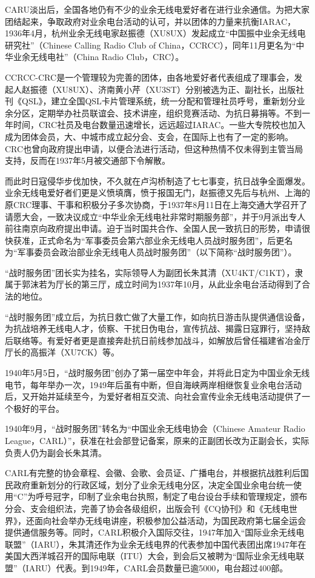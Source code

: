 \documentclass[12pt,UTF8]{ctexbook}
\begin{document}
CARU淡出后，全国各地仍有不少的业余无线电爱好者在进行业余通信。为把大家团结起来，争取政府对业余电台活动的认可，并以团体的力量来抗衡IARAC，1936年4月，杭州业余无线电家赵振德（XU8UX）发起成立“中国振中业余无线电研究社”（Chinese Calling Radio Club of China，CCRCC），同年11月更名为“中华业余无线电社”（China Radio Club，CRC）。

CCRCC-CRC是一个管理较为完善的团体，由各地爱好者代表组成了理事会，发起人赵振德（XU8UX）、济南黄小芹（XU3ST）分别被选为正、副社长，出版社刊《QSL》，建立全国QSL卡片管理系统，统一分配和管理社员呼号，重新划分业余分区，定期举办社员联谊会、技术讲座，组织竞赛活动、为抗日募捐等。不到一年时间，CRC社员及电台数量迅速增长，远远超过IARAC。一些大专院校也加入成为团体会员，大、中城市成立起分会、支会，在国际上也有了一定的影响。CRC也曾向政府提出申请，以便合法进行活动，但这种热情不仅未得到主管当局支持，反而在1937年5月被交通部下令解散。

而此时日寇侵华步伐加快，不久就在卢沟桥制造了七七事变，抗日战争全面爆发。业余无线电爱好者们更是义愤填膺，愤于报国无门，赵振德又先后与杭州、上海的原CRC理事、干事和积极分子多次协商，于1937年8月11日在上海交通大学召开了请愿大会，一致决议成立“中华业余无线电社非常时期服务部”，并于9月派出专人前往南京向政府提出申请。迫于当时国共合作、全国人民一致抗日的形势，申请很快获准，正式命名为“军事委员会第六部业余无线电人员战时服务团”，后更名为“军事委员会政治部业余无线电人员战时服务团”（以下简称“战时服务团”）。

“战时服务团”团长实为挂名，实际领导人为副团长朱其清（XU4KT/C1KT），隶属于郭沫若为厅长的第三厅，成立时间为1937年10月，从此业余电台活动得到了合法的地位。

“战时服务团”成立后，为抗日救亡做了大量工作，如向抗日游击队提供通信设备，为抗战培养无线电人才，侦察、干扰日伪电台，宣传抗战、揭露日寇罪行，坚持敌后联络等。有爱好者更是直接奔赴抗日前线参加战斗，如解放后曾任福建省冶金厅厅长的高振洋（XU7CK）等。

1940年5月5日，“战时服务团”创办了第一届空中年会，并将此日定为中国业余无线电节，每年举办一次，1949年后虽有中断，但自海峡两岸相继恢复业余电台活动后，又开始并延续至今，为爱好者相互交流、向社会宣传业余无线电活动提供了一个极好的平台。

1940年9月，“战时服务团”转名为“中国业余无线电协会（Chinese Amateur Radio League，CARL）”，获准在社会部登记备案，原来的正副团长改为正副会长，实际负责人仍为副会长朱其清。

CARL有完整的协会章程、会徽、会歌、会员证、广播电台，并根据抗战胜利后国民政府重新划分的行政区域，划分了业余无线电分区，决定全国业余电台统一使用“C”为呼号冠字，印制了业余电台执照，制定了电台设台手续和管理规定，颁布分会、支会组织法，完善了协会各级组织，出版会刊《CQ协刊》和《无线电世界》，还面向社会举办无线电讲座，积极参加公益活动，为国民政府第七届全运会提供通信服务等。同时，CARL积极介入国际交往，1947年加入“国际业余无线电联盟”（IARU），朱其清还作为业余无线电界的代表参加中国代表团出席1947年在美国大西洋城召开的国际电联（ITU）大会，到会后又被聘为“国际业余无线电联盟”（IARU）代表。到1949年，CARL会员数量已逾5000，电台超过400部。
\end{document}
